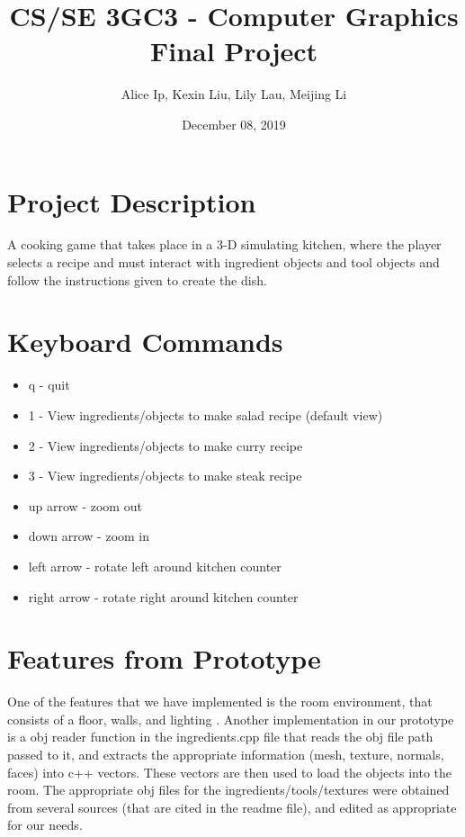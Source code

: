 \documentclass[11pt]{article}
\author{Alice Ip, Kexin Liu, Lily Lau, Meijing Li}
\date{December 08, 2019}
\title{CS/SE 3GC3 - Computer Graphics Final Project}
\begin{document}
\maketitle

\section*{Project Description}
\label{sec:org7b3eb19}
A cooking game that takes place in a 3-D simulating kitchen,
 where the player selects a recipe and must interact with
 ingredient objects and tool objects and follow the instructions
 given to create the dish.

\section*{Keyboard Commands}
\label{sec:org512dd7d}
\begin{itemize}
\item q - quit
\item 1 - View ingredients/objects to make salad recipe (default view)
\item 2 - View ingredients/objects to make curry recipe
\item 3 - View ingredients/objects to make steak recipe
\item up arrow - zoom out
\item down arrow - zoom in
\item left arrow - rotate left around kitchen counter
\item right arrow - rotate right around kitchen counter
\end{itemize}

\section*{Features from Prototype}
\label{sec:orgb2992fb}

One of the features that we have implemented is the room environment,
 that consists of a floor, walls, and lighting . Another implementation
 in our prototype is a obj reader function
 in the ingredients.cpp file that reads the obj file path passed to it,
 and extracts the appropriate information (mesh, texture, normals,
 faces) into c++ vectors. These vectors are then used to load the
 objects into the room. The appropriate obj files for the
 ingredients/tools/textures were obtained from several sources
 (that are cited in the readme file), and edited as appropriate 
for our needs. 
\end{document}
